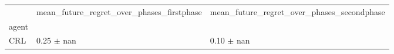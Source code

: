 \begin{tabular}{lll}
\toprule
 & mean_future_regret_over_phases_firstphase & mean_future_regret_over_phases_secondphase \\
agent &  &  \\
\midrule
CRL & 0.25 $\pm$ nan & 0.10 $\pm$ nan \\
\bottomrule
\end{tabular}
